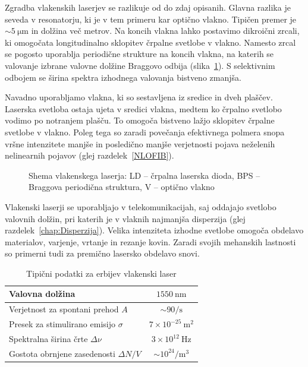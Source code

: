 Zgradba vlakenskih laserjev se razlikuje od do zdaj opisanih. Glavna razlika je
seveda v resonatorju, ki je v tem primeru kar optično vlakno. Tipičen premer je 
$\sim 5~\si{\micro\meter}$ in dolžina več metrov. Na koncih vlakna lahko
postavimo dikroični zrcali, ki omogočata longitudinalno sklopitev črpalne svetlobe 
v vlakno. Namesto zrcal se pogosto uporablja periodične strukture 
na koncih vlakna, na katerih se valovanje izbrane valovne dolžine Braggovo odbija
(slika~\ref{fig:Fibshema}). 
S selektivnim odbojem se širina spektra izhodnega valovanja bistveno zmanjša. 

Navadno uporabljamo vlakna, ki so sestavljena iz sredice in dveh plaščev. Laserska
svetloba ostaja ujeta v sredici vlakna, medtem ko črpalno svetlobo vodimo po notranjem plašču. To
omogoča bistveno lažjo sklopitev črpalne svetlobe v vlakno. Poleg tega so zaradi povečanja
efektivnega polmera snopa vršne intenzitete manjše in posledično manjše verjetnosti
pojava neželenih nelinearnih pojavov (glej razdelek~\ref{NLOFIB}).

\begin{figure}[ht]
\centering
\def\svgwidth{100truemm} 

\caption{Shema vlakenskega laserja: LD -- črpalna laserska dioda, 
BPS -- Braggova periodična struktura, V -- optično vlakno
}
\label{fig:Fibshema}
\end{figure}

Vlakenski laserji se uporabljajo v telekomunikacijah, saj oddajajo svetlobo 
valovnih dolžin, pri katerih je v vlaknih najmanjša disperzija (glej razdelek~\ref{chap:Disperzija}). 
Velika intenziteta izhodne svetlobe omogoča obdelavo materialov, varjenje, vrtanje in rezanje kovin. 
Zaradi svojih mehanskih lastnosti so primerni tudi za premično lasersko obdelavo snovi.

\begin{table}[ht]
\begin{center}
\begin{tabular}{|l|c|}\hline
Valovna dolžina  & $1550~\si{\nano\meter}$\\ \hline
Verjetnost za spontani prehod $A$ & $ \sim 90/\si{\second}$ \\ \hline
Presek za stimulirano emisijo $\sigma$ & $7 \times 10^{-25}~\si{\metre}^2$ \\ \hline
Spektralna širina črte $\Delta \nu$ & $3 \times 10^{12}~\si{\hertz}$  \\ \hline
Gostota obrnjene zasedenosti $\Delta N/V$ & $ \sim 10^{24}/\si{\metre}^3$ \\ \hline
\end{tabular}
\caption{Tipični podatki za erbijev vlakenski laser}
\label{tab:fib}
\end{center}
\end{table}

